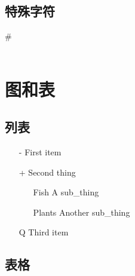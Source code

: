 \documentclass[a4paper,12pt]{article}
\begin{document}
        \subsection{特殊字符}
    
        \#  \indent{\textbackslash} 
        \\ \indent{\$} %
        \\   


    \section{图和表}

        \subsection{列表}
        \begin{enumerate}
            \item[-] First item     %
       
            \item[+]Second thing
                \begin{itemize}
                    \item[Fish] A sub\_thing
            
                    \item[Plants] Another sub\_thing
                \end{itemize}

            \item[Q] Third item
        \end{enumerate}
    
        \subsection{表格}
    
\end{document}
